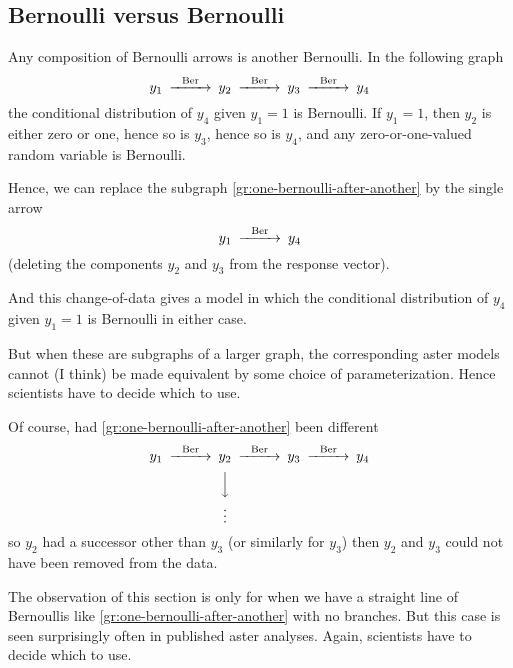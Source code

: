 \subsection{Bernoulli versus Bernoulli}

Any composition of Bernoulli arrows is another Bernoulli.  In the following
graph
\begin{equation} \label{gr:one-bernoulli-after-another}
\begin{CD}
   y_1 @>\text{Ber}>> y_2 @>\text{Ber}>> y_3 @>\text{Ber}>> y_4
\end{CD}
\end{equation}
the conditional distribution of $y_4$ given $y_1 = 1$ is Bernoulli.
If $y_1 = 1$, then $y_2$ is either zero or one, hence so is $y_3$,
hence so is $y_4$, and any zero-or-one-valued random variable is Bernoulli.

Hence, we can replace the subgraph \eqref{gr:one-bernoulli-after-another}
by the single arrow
\begin{equation} \label{gr:one-bernoulli}
\begin{CD}
   y_1 @>\text{Ber}>> y_4
\end{CD}
\end{equation}
(deleting the components $y_2$ and $y_3$ from the response vector).

And this change-of-data gives a model in which the conditional distribution
of $y_4$ given $y_1 = 1$ is Bernoulli in either case.

But when these are subgraphs of a larger graph,
the corresponding aster models 
cannot (I think) be made equivalent
by some choice of parameterization.
Hence scientists have to decide which to use.

Of course, had \eqref{gr:one-bernoulli-after-another} been different
\begin{equation*}
\begin{CD}
   y_1 @>\text{Ber}>> y_2 @>\text{Ber}>> y_3 @>\text{Ber}>> y_4
   \\
   @.
   @VVV
   \\
   \hphantom{y_1}
   @.
   \vdots
\end{CD}
\end{equation*}
so $y_2$ had a successor other than $y_3$ (or similarly for $y_3$)
then $y_2$ and $y_3$ could not have been removed from the data.

The observation of this section is only for when we have a straight line
of Bernoullis like \eqref{gr:one-bernoulli-after-another} with no branches.
But this case is seen surprisingly often in published aster analyses.
Again, scientists have to decide which to use.

